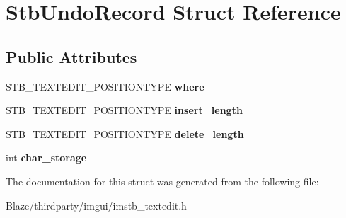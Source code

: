 \hypertarget{structStbUndoRecord}{}\section{Stb\+Undo\+Record Struct Reference}
\label{structStbUndoRecord}
\subsection*{Public Attributes}
\begin{DoxyCompactItemize}
\item 
\mbox{\label{structStbUndoRecord_a49e87adbb75a18ffba1f853ac974b31d}} 
S\+T\+B\+\_\+\+T\+E\+X\+T\+E\+D\+I\+T\+\_\+\+P\+O\+S\+I\+T\+I\+O\+N\+T\+Y\+PE {\bfseries where}
\item 
\mbox{\label{structStbUndoRecord_a1916780aa21b7be61be2492fda2df9cc}} 
S\+T\+B\+\_\+\+T\+E\+X\+T\+E\+D\+I\+T\+\_\+\+P\+O\+S\+I\+T\+I\+O\+N\+T\+Y\+PE {\bfseries insert\+\_\+length}
\item 
\mbox{\label{structStbUndoRecord_a39c1e6f00368b5120114256a17b859cd}} 
S\+T\+B\+\_\+\+T\+E\+X\+T\+E\+D\+I\+T\+\_\+\+P\+O\+S\+I\+T\+I\+O\+N\+T\+Y\+PE {\bfseries delete\+\_\+length}
\item 
\mbox{\label{structStbUndoRecord_ab317aa50c7a222ece13840a4b65167c0}} 
int {\bfseries char\+\_\+storage}
\end{DoxyCompactItemize}


The documentation for this struct was generated from the following file\+:\begin{DoxyCompactItemize}
\item 
Blaze/thirdparty/imgui/imstb\+\_\+textedit.\+h\end{DoxyCompactItemize}
